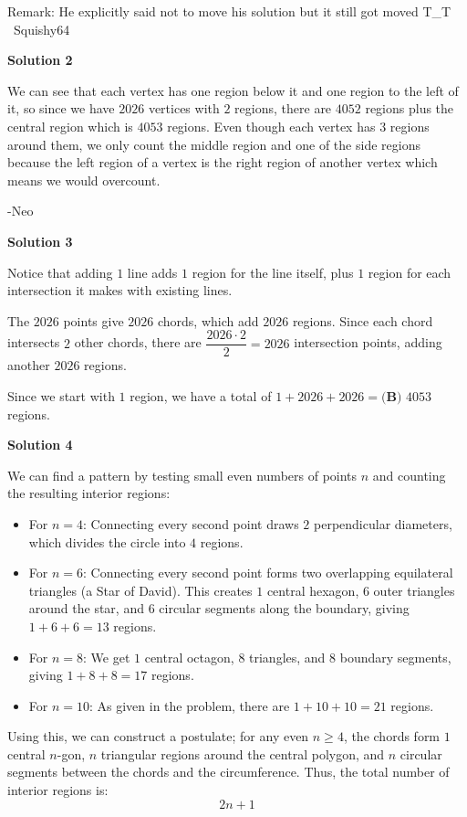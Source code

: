 \begin{enumerate}
 Remark: He explicitly said not to move his solution but it still got moved T\_T ~Squishy64

 



\textbf{Solution 2}

We can see that each vertex has one region below it and one region to the left of it, so since we have \(2026\) vertices with \(2\) regions, there are \(4052\) regions plus the central region which is $\boxed{4053}$ regions. Even though each vertex has \(3\) regions around them, we only count the middle region and one of the side regions because the left region of a vertex is the right region of another vertex which means we would overcount. 

 -Neo

 



\textbf{Solution 3}

Notice that adding $1$ line adds $1$ region for the line itself, plus $1$ region for each intersection it makes with existing lines. 

 The $2026$ points give $2026$ chords, which add $2026$ regions. Since each chord intersects $2$ other chords, there are $\dfrac{2026 \cdot 2}{2} = 2026$ intersection points, adding another $2026$ regions. 

 Since we start with $1$ region, we have a total of $1 + 2026 + 2026 = \boxed{\textbf{(B) } 4053}$ regions.

 



\textbf{Solution 4}

We can find a pattern by testing small even numbers of points $n$ and counting the resulting interior regions:

 
            \begin{itemize}
        \item For $n = 4$: Connecting every second point draws $2$ perpendicular diameters, which divides the circle into $4$ regions.
        \item For $n = 6$: Connecting every second point forms two overlapping equilateral triangles (a Star of David). This creates $1$ central hexagon, $6$ outer triangles around the star, and $6$ circular segments along the boundary, giving $1 + 6 + 6 = 13$ regions.
        \item For $n = 8$: We get $1$ central octagon, $8$ triangles, and $8$ boundary segments, giving $1 + 8 + 8 = 17$ regions.
        \item For $n = 10$: As given in the problem, there are $1 + 10 + 10 = 21$ regions.
            \end{itemize}
            Using this, we can construct a postulate; for any even $n \ge 4$, the chords form $1$ central $n$-gon, $n$ triangular regions around the central polygon, and $n$ circular segments between the chords and the circumference. Thus, the total number of interior regions is:
 \[2n + 1\]


\end{enumerate}
